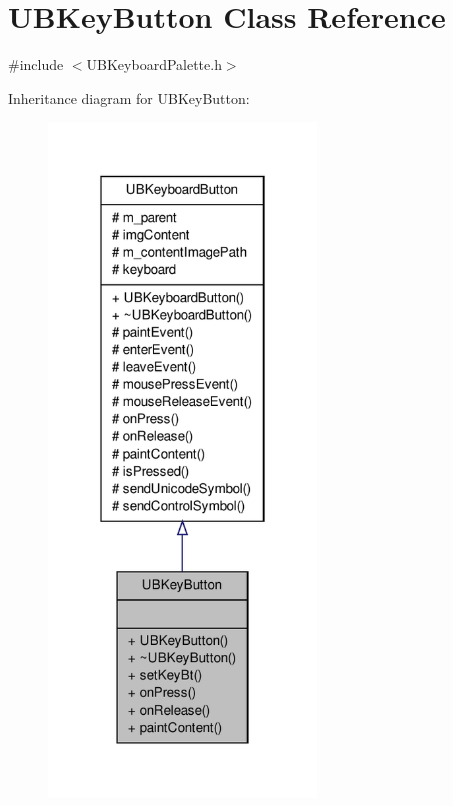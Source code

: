 \hypertarget{class_u_b_key_button}{\section{U\-B\-Key\-Button Class Reference}
\label{d3/d04/class_u_b_key_button}
}


{\ttfamily \#include $<$U\-B\-Keyboard\-Palette.\-h$>$}



Inheritance diagram for U\-B\-Key\-Button\-:
\nopagebreak
\begin{figure}[H]
\begin{center}
\leavevmode
\includegraphics[width=202pt]{d2/df5/class_u_b_key_button__inherit__graph}
\end{center}
\end{figure}



